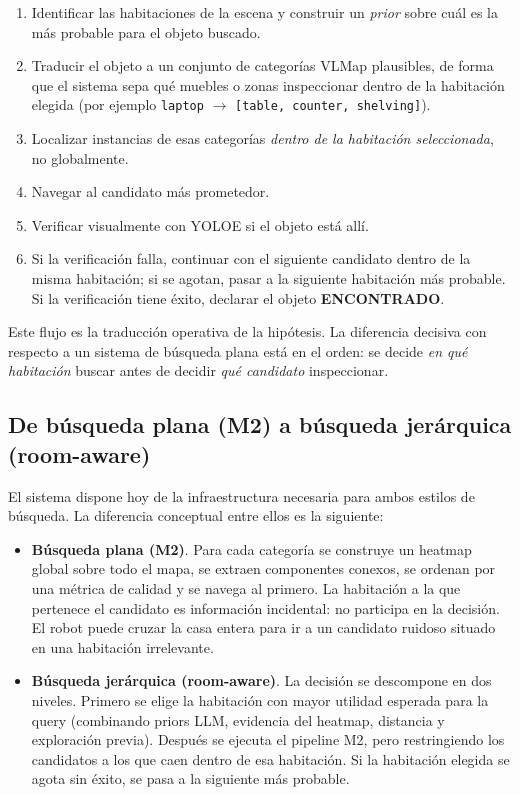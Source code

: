 \documentclass[11pt,a4paper]{article}
\begin{document}
\begin{enumerate}
  \item Identificar las habitaciones de la escena y construir un \emph{prior}
        sobre cuál es la más probable para el objeto buscado.
  \item Traducir el objeto a un conjunto de categorías VLMap plausibles, de
        forma que el sistema sepa qué muebles o zonas inspeccionar dentro de la
        habitación elegida (por ejemplo \texttt{laptop} $\rightarrow$
        \texttt{[table, counter, shelving]}).
  \item Localizar instancias de esas categorías \emph{dentro de la habitación
        seleccionada}, no globalmente.
  \item Navegar al candidato más prometedor.
  \item Verificar visualmente con YOLOE si el objeto está allí.
  \item Si la verificación falla, continuar con el siguiente candidato dentro
        de la misma habitación; si se agotan, pasar a la siguiente habitación
        más probable. Si la verificación tiene éxito, declarar el objeto
        \textbf{ENCONTRADO}.
\end{enumerate}

Este flujo es la traducción operativa de la hipótesis. La diferencia decisiva
con respecto a un sistema de búsqueda plana está en el orden: se decide
\emph{en qué habitación} buscar antes de decidir \emph{qué candidato}
inspeccionar.

\subsection{De búsqueda plana (M2) a búsqueda jerárquica (room-aware)}
\label{sec:m2-vs-room-aware}

El sistema dispone hoy de la infraestructura necesaria para ambos estilos de
búsqueda. La diferencia conceptual entre ellos es la siguiente:

\begin{itemize}
  \item \textbf{Búsqueda plana (M2)}. Para cada categoría se construye un
        heatmap global sobre todo el mapa, se extraen componentes conexos, se
        ordenan por una métrica de calidad y se navega al primero. La
        habitación a la que pertenece el candidato es información incidental:
        no participa en la decisión. El robot puede cruzar la casa entera para
        ir a un candidato ruidoso situado en una habitación irrelevante.
  \item \textbf{Búsqueda jerárquica (room-aware)}. La decisión se descompone en
        dos niveles. Primero se elige la habitación con mayor utilidad esperada
        para la query (combinando priors LLM, evidencia del heatmap, distancia
        y exploración previa). Después se ejecuta el pipeline M2, pero
        restringiendo los candidatos a los que caen dentro de esa habitación.
        Si la habitación elegida se agota sin éxito, se pasa a la siguiente
        más probable.
\end{itemize}
\end{document}
